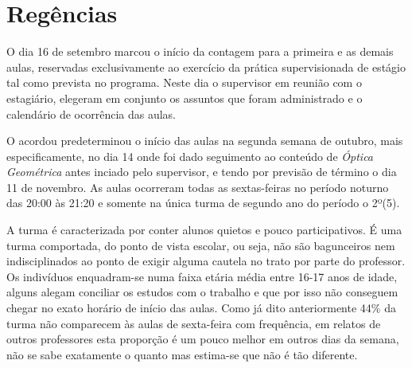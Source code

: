 \chapter{Regências}
\label{cap:regencias}



\noindent O dia 16 de setembro marcou o início da contagem para a primeira e as demais aulas, reservadas exclusivamente ao exercício da prática supervisionada de estágio tal como prevista no programa. Neste dia o supervisor em reunião com o estagiário, elegeram em conjunto os assuntos que foram administrado e o calendário de ocorrência das aulas.

O acordou predeterminou o início das aulas na segunda semana de outubro, mais especificamente, no dia 14 onde foi dado seguimento ao conteúdo de \emph{Óptica Geométrica} antes inciado pelo supervisor, e tendo por previsão de término o dia 11 de novembro. As aulas ocorreram todas as sextas-feiras no período noturno das 20:00 às 21:20 e somente na única turma de segundo ano do período o 2º(5).

A turma é caracterizada por conter alunos quietos e pouco participativos. É uma turma comportada, do ponto de vista escolar, ou seja, não são bagunceiros nem indisciplinados ao ponto de exigir alguma cautela no trato por parte do professor. Os indivíduos enquadram-se numa faixa etária média entre 16-17 anos de idade, alguns alegam conciliar os estudos com o trabalho e que por isso não conseguem chegar no exato horário de início das aulas. Como já dito anteriormente 44\% da turma não comparecem às aulas de sexta-feira com frequência, em relatos de outros professores esta proporção é um pouco melhor em outros dias da semana, não se sabe exatamente o quanto mas estima-se que não é tão diferente.

